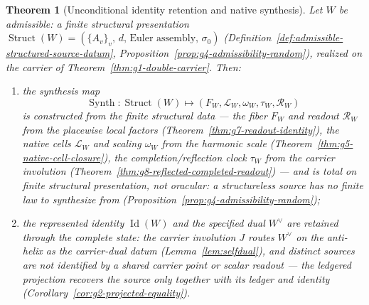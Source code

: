 \documentclass[11pt]{article}
\newtheorem{theorem}{Theorem}
\theoremstyle{definition}
\begin{document}
\begin{theorem}[Unconditional identity retention and native synthesis]\label{thm:g3-g4-identity-synthesis}
Let \(W\) be admissible: a finite structural presentation
\(\operatorname{Struct}(W)=(\{A_v\}_v,\,d,\,\text{Euler assembly},\,\sigma_0)\)
(Definition~\ref{def:admissible-structured-source-datum},
Proposition~\ref{prop:g4-admissibility-random}), realized on the carrier of
Theorem~\ref{thm:g1-double-carrier}.  Then:
\begin{enumerate}
\item[\textup{(synthesis)}] the synthesis map
\[
\operatorname{Synth}:\operatorname{Struct}(W)\longmapsto
(F_W,\mathcal L_W,\omega_W,\tau_W,\mathcal R_W)
\]
is constructed from the finite structural data --- the fiber \(F_W\) and readout
\(\mathcal R_W\) from the placewise local factors
(Theorem~\ref{thm:g7-readout-identity}), the native cells \(\mathcal L_W\) and
scaling \(\omega_W\) from the harmonic scale
(Theorem~\ref{thm:g5-native-cell-closure}), the completion/reflection clock
\(\tau_W\) from the carrier involution
(Theorem~\ref{thm:g8-reflected-completed-readout}) --- and is total on finite
structural presentation, not oracular: a structureless source has no finite law
to synthesize from (Proposition~\ref{prop:g4-admissibility-random});
\item[\textup{(identity)}] the represented identity \(\operatorname{Id}(W)\) and the
specified dual \(W^\vee\) are retained through the complete state: the carrier
involution \(J\) routes \(W^\vee\) on the anti-helix as the carrier-dual datum
(Lemma~\ref{lem:selfdual}), and distinct sources are not identified by a shared
carrier point or scalar readout --- the ledgered projection recovers the source
only together with its ledger and identity
(Corollary~\ref{cor:g2-projected-equality}).
\end{enumerate}
\end{theorem}
\end{document}
